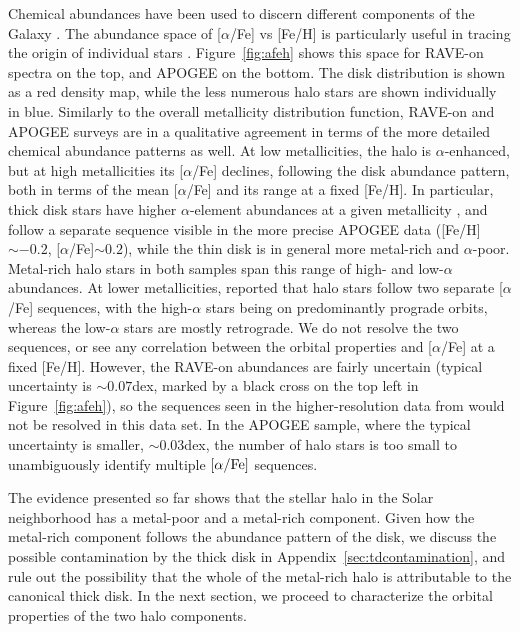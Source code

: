 \documentclass[apj, twocolappendix, numberedappendix, appendixfloats]{emulateapj}
\begin{document}
Chemical abundances have been used to discern different components of the Galaxy \citep[e.g.,][]{galrev1998}.
The abundance space of [$\alpha$/Fe] vs [Fe/H] is particularly useful in tracing the origin of individual stars \citep[e.g.,][]{lee2015}.
Figure~\ref{fig:afeh} shows this space for RAVE-on spectra on the top, and APOGEE on the bottom.
The disk distribution is shown as a red density map, while the less numerous halo stars are shown individually in blue.
Similarly to the overall metallicity distribution function, RAVE-on and APOGEE surveys are in a qualitative agreement in terms of the more detailed chemical abundance patterns as well.
At low metallicities, the halo is $\alpha$-enhanced, but at high metallicities its [$\alpha$/Fe] declines, following the disk abundance pattern, both in terms of the mean [$\alpha$/Fe] and its range at a fixed [Fe/H].
In particular, thick disk stars have higher $\alpha$-element abundances at a given metallicity \citep[e.g.,][]{nidever2014}, and follow a separate sequence visible in the more precise APOGEE data ([Fe/H]$\sim-0.2$, [$\alpha$/Fe]$\sim0.2$), while the thin disk is in general more metal-rich and $\alpha$-poor.
Metal-rich halo stars in both samples span this range of high- and low-$\alpha$ abundances.
At lower metallicities, \citet{ns2010} reported that halo stars follow two separate [$\alpha$/Fe] sequences, with the high-$\alpha$ stars being on predominantly prograde orbits, whereas the low-$\alpha$ stars are mostly retrograde.
We do not resolve the two sequences, or see any correlation between the orbital properties and [$\alpha$/Fe] at a fixed [Fe/H].
However, the RAVE-on abundances are fairly uncertain (typical uncertainty is $\sim0.07$\;dex, marked by a black cross on the top left in Figure~\ref{fig:afeh}), so the sequences seen in the higher-resolution data from \citet{ns2010} would not be resolved in this data set.
In the APOGEE sample, where the typical uncertainty is smaller, $\sim0.03$\;dex, the number of halo stars is too small to unambiguously identify multiple $[\alpha/\rm Fe]$ sequences.

The evidence presented so far shows that the stellar halo in the Solar neighborhood has a metal-poor and a metal-rich component.
Given how the metal-rich component follows the abundance pattern of the disk, we discuss the possible contamination by the thick disk in Appendix~\ref{sec:tdcontamination}, and rule out the possibility that the whole of the metal-rich halo is attributable to the canonical thick disk.
In the next section, we proceed to characterize the orbital properties of the two halo components.
\end{document}
